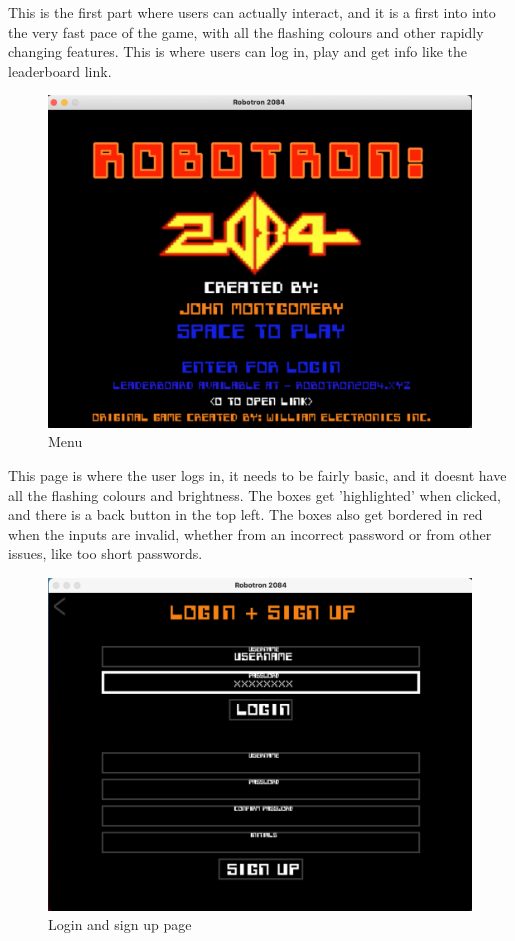 \newpage
This is the first part where users can actually interact, and it is a first into into the very fast pace of the game, with all the flashing colours and other rapidly changing features. This is where users can log in, play and get info like the leaderboard link.
\begin{figure}[H]
  \includegraphics[width=1\linewidth]{Figures/menu.png}
  \centering
  \caption{Menu}
  \label{fig:HCI3}
\end{figure}
\newpage
This page is where the user logs in, it needs to be fairly basic, and it doesnt have all the flashing colours and brightness. The boxes get 'highlighted' when clicked, and there is a back button in the top left. The boxes also get bordered in red when the inputs are invalid, whether from an incorrect password or from other issues, like too short passwords.
\begin{figure}[H]
  \includegraphics[width=1\linewidth]{Figures/login.png}
  \centering
  \caption{Login and sign up page}
  \label{fig:HCI4}
\end{figure}
